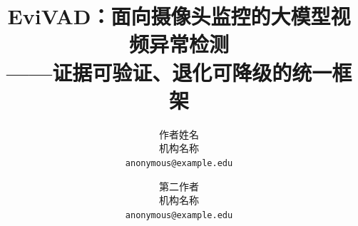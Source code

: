 \documentclass[10pt,twocolumn,letterpaper]{article}
\title{EviVAD：面向摄像头监控的大模型视频异常检测\\——证据可验证、退化可降级的统一框架}
\author{作者姓名\\
机构名称\\
{\tt\small anonymous@example.edu}
\and
第二作者\\
机构名称\\
{\tt\small anonymous@example.edu}
}
\begin{document}
\maketitle







{
    \small
    
    
}

% 
\end{document}
